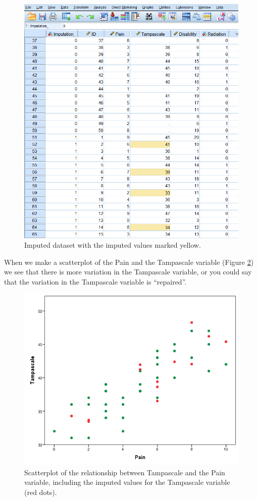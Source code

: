 \documentclass[]{book}
\theoremstyle{definition}
\theoremstyle{definition}
\theoremstyle{definition}
\theoremstyle{remark}
\begin{document}
\begin{figure}

{\centering \includegraphics[width=0.7\linewidth]{images/fig3.23} 

}

\caption{Imputed dataset with the imputed values marked yellow.}\label{fig:fig3-23}
\end{figure}

When we make a scatterplot of the Pain and the Tampascale variable
(Figure \ref{fig:fig3-24}) we see that there is more variation in the
Tampascale variable, or you could say that the variation in the
Tampascale variable is ``repaired''.

\begin{figure}

{\centering \includegraphics[width=0.7\linewidth]{images/fig3.24} 

}

\caption{Scatterplot of the relationship between Tampascale and the Pain variable, including the imputed values for the Tampascale variable (red dots).}\label{fig:fig3-24}
\end{figure}
\end{document}
